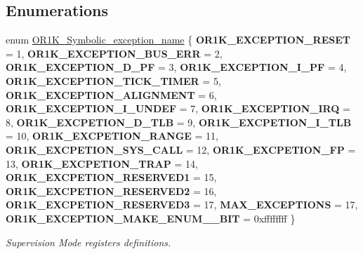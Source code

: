 \subsection*{Enumerations}
\begin{DoxyCompactItemize}
\item 
enum \mbox{\hyperlink{or1k-utility_8h_a1f2f3dd5f9aa087755d57e1b00f51553}{O\+R1\+K\+\_\+\+Symbolic\+\_\+exception\+\_\+name}} \{ \newline
{\bfseries O\+R1\+K\+\_\+\+E\+X\+C\+E\+P\+T\+I\+O\+N\+\_\+\+R\+E\+S\+ET} = 1, 
{\bfseries O\+R1\+K\+\_\+\+E\+X\+C\+E\+P\+T\+I\+O\+N\+\_\+\+B\+U\+S\+\_\+\+E\+RR} = 2, 
{\bfseries O\+R1\+K\+\_\+\+E\+X\+C\+E\+P\+T\+I\+O\+N\+\_\+\+D\+\_\+\+PF} = 3, 
{\bfseries O\+R1\+K\+\_\+\+E\+X\+C\+E\+P\+T\+I\+O\+N\+\_\+\+I\+\_\+\+PF} = 4, 
\newline
{\bfseries O\+R1\+K\+\_\+\+E\+X\+C\+E\+P\+T\+I\+O\+N\+\_\+\+T\+I\+C\+K\+\_\+\+T\+I\+M\+ER} = 5, 
{\bfseries O\+R1\+K\+\_\+\+E\+X\+C\+E\+P\+T\+I\+O\+N\+\_\+\+A\+L\+I\+G\+N\+M\+E\+NT} = 6, 
{\bfseries O\+R1\+K\+\_\+\+E\+X\+C\+E\+P\+T\+I\+O\+N\+\_\+\+I\+\_\+\+U\+N\+D\+EF} = 7, 
{\bfseries O\+R1\+K\+\_\+\+E\+X\+C\+E\+P\+T\+I\+O\+N\+\_\+\+I\+RQ} = 8, 
\newline
{\bfseries O\+R1\+K\+\_\+\+E\+X\+C\+P\+E\+T\+I\+O\+N\+\_\+\+D\+\_\+\+T\+LB} = 9, 
{\bfseries O\+R1\+K\+\_\+\+E\+X\+C\+P\+E\+T\+I\+O\+N\+\_\+\+I\+\_\+\+T\+LB} = 10, 
{\bfseries O\+R1\+K\+\_\+\+E\+X\+C\+P\+E\+T\+I\+O\+N\+\_\+\+R\+A\+N\+GE} = 11, 
{\bfseries O\+R1\+K\+\_\+\+E\+X\+C\+P\+E\+T\+I\+O\+N\+\_\+\+S\+Y\+S\+\_\+\+C\+A\+LL} = 12, 
\newline
{\bfseries O\+R1\+K\+\_\+\+E\+X\+C\+P\+E\+T\+I\+O\+N\+\_\+\+FP} = 13, 
{\bfseries O\+R1\+K\+\_\+\+E\+X\+C\+P\+E\+T\+I\+O\+N\+\_\+\+T\+R\+AP} = 14, 
{\bfseries O\+R1\+K\+\_\+\+E\+X\+C\+P\+E\+T\+I\+O\+N\+\_\+\+R\+E\+S\+E\+R\+V\+E\+D1} = 15, 
{\bfseries O\+R1\+K\+\_\+\+E\+X\+C\+P\+E\+T\+I\+O\+N\+\_\+\+R\+E\+S\+E\+R\+V\+E\+D2} = 16, 
\newline
{\bfseries O\+R1\+K\+\_\+\+E\+X\+C\+P\+E\+T\+I\+O\+N\+\_\+\+R\+E\+S\+E\+R\+V\+E\+D3} = 17, 
{\bfseries M\+A\+X\+\_\+\+E\+X\+C\+E\+P\+T\+I\+O\+NS} = 17, 
{\bfseries O\+R1\+K\+\_\+\+E\+X\+C\+E\+P\+T\+I\+O\+N\+\_\+\+M\+A\+K\+E\+\_\+\+E\+N\+U\+M\+\_\+\_\+\+B\+IT} = 0xffffffff
 \}
\begin{DoxyCompactList}\small\item\em Supervision Mode registers definitions. \end{DoxyCompactList}\end{DoxyCompactItemize}


